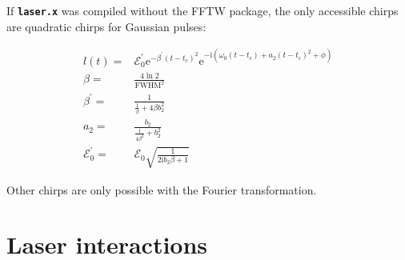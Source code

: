 \documentclass[a4paper,11pt,DIV=15,openany,twoside=false]{scrbook}
\newcommand{\ttmdump}[1]{#1}
\newcommand{\ttt}[1]{\textbf{\texttt{#1}}}
\newcommand{\E}{\ensuremath{\mathrm{e}}}
\newcommand{\I}{\ensuremath{\mathrm{i}}}
\begin{document}
If \ttt{laser.x} was compiled without the FFTW package, the only accessible chirps are quadratic chirps for Gaussian pulses:
\ttmdump{
  \begin{align}
    l(t)=&
    \mathcal{E}_0^\prime
    \E^{-\beta^\prime(t-t_c)^2}
    \E^{-\I\left(
      \omega_0(t-t_c)+a_2(t-t_c)^2+\phi
    \right)}\\
    \beta=&\frac{4\ln 2}{\mathrm{FWHM}^2}\\
    \beta^\prime=&\frac{1}{\frac{1}{\beta}+4\beta b_2^2}\\
    a_2=&\frac{b_2}{\frac{1}{4\beta^2}+b^2_2}\\
    \mathcal{E}_0^\prime=&\mathcal{E}_0\sqrt{\frac{1}{2\I b_2\beta+1}}
  \end{align}
}
Other chirps are only possible with the Fourier transformation.


\section{Laser interactions}\label{met:laser}
\end{document}
